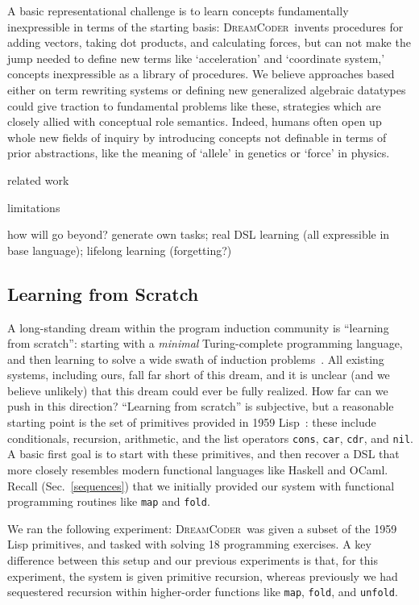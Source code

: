 \documentclass{article}
\newcommand{\system}{\textsc{DreamCoder}~}
\newcommand{\code}[1]{{\footnotesize\texttt{#1}}}
\begin{document}
A basic representational challenge is to
learn concepts fundamentally inexpressible in terms of the starting basis: \system invents procedures for
adding vectors, taking dot products, and calculating forces,
but can not make the jump needed to define new terms like `acceleration' and `coordinate system,'
concepts inexpressible as a library of procedures.
We believe approaches based either on term rewriting systems or defining new generalized algebraic datatypes could give traction to fundamental problems like these,
strategies which are closely allied with conceptual role semantics.
Indeed, humans often open up whole new fields of inquiry by introducing concepts not
definable in terms of prior abstractions,
like the meaning of `allele' in genetics
or `force' in physics.




related work

limitations

how will go beyond? generate own tasks; real DSL learning (all expressible in base language); lifelong learning (forgetting?)

\subsection{Learning from Scratch}
A long-standing dream within the program induction community
is ``learning from scratch'': starting with a \emph{minimal} Turing-complete programming language,
and then learning to solve a wide swath of
induction problems~\cite{solomonoff1964formal,schmidhuber2004optimal,hutter2004universal,solomonoff1989system}.
All existing systems,
including ours,
fall far short of this dream,
and it is unclear (and we believe unlikely)
that this dream could ever be fully realized.
How far can we push in this direction?
``Learning from scratch'' is subjective, but a reasonable
starting point is the set of primitives provided in 1959
Lisp~\cite{mccarthy1960recursive}: these include
conditionals, recursion, arithmetic, and the 
list operators \code{cons}, \code{car}, \code{cdr}, and \code{nil}.
A  basic first goal is to start with
these primitives,
and then recover a DSL that
more closely resembles modern functional languages like Haskell and OCaml.
Recall (Sec.~\ref{sequences})
that we initially provided our system with functional programming routines like
\code{map} and \code{fold}.

We ran the following experiment: \system was given a subset of the
1959 Lisp primitives, and tasked with solving 18 programming
exercises. A key difference between this setup and our previous
experiments is that, for this experiment, the system is given
primitive recursion, whereas previously we had sequestered recursion
within higher-order functions like \code{map}, \code{fold}, and
\code{unfold}.
\end{document}

